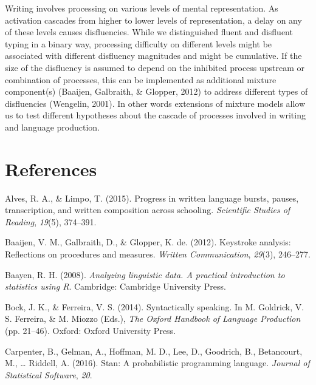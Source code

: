\documentclass[english,man,floatsintext]{apa7}
\begin{document}
Writing involves processing on various levels of mental representation. As activation cascades from higher to lower levels of representation, a delay on any of these levels causes disfluencies. While we distinguished fluent and disfluent typing in a binary way, processing difficulty on different levels might be associated with different disfluency magnitudes and might be cumulative. If the size of the disfluency is assumed to depend on the inhibited process upstream or combination of processes, this can be implemented as additional mixture component(s) (Baaijen, Galbraith, \& Glopper, 2012) to address different types of disfluencies (Wengelin, 2001). In other words extensions of mixture models allow us to test different hypotheses about the cascade of processes involved in writing and language production.

\hypertarget{references}{%
\section{References}\label{references}}

\begingroup
\setlength{\parindent}{-0.5in}
\setlength{\leftskip}{0.5in}

\hypertarget{ref}{}

\endgroup

\hypertarget{refs}{}
\leavevmode\hypertarget{ref-alves2015progress}{}%
Alves, R. A., \& Limpo, T. (2015). Progress in written language bursts, pauses, transcription, and written composition across schooling. \emph{Scientific Studies of Reading}, \emph{19}(5), 374--391.

\leavevmode\hypertarget{ref-baaijen2012keystroke}{}%
Baaijen, V. M., Galbraith, D., \& Glopper, K. de. (2012). Keystroke analysis: Reflections on procedures and measures. \emph{Written Communication}, \emph{29}(3), 246--277.

\leavevmode\hypertarget{ref-baa08book}{}%
Baayen, R. H. (2008). \emph{Analyzing linguistic data. A practical introduction to statistics using R}. Cambridge: Cambridge University Press.

\leavevmode\hypertarget{ref-bock2014syntactically}{}%
Bock, J. K., \& Ferreira, V. S. (2014). Syntactically speaking. In M. Goldrick, V. S. Ferreira, \& M. Miozzo (Eds.), \emph{The Oxford Handbook of Language Production} (pp. 21--46). Oxford: Oxford University Press.

\leavevmode\hypertarget{ref-carpenter2016stan}{}%
Carpenter, B., Gelman, A., Hoffman, M. D., Lee, D., Goodrich, B., Betancourt, M., \ldots{} Riddell, A. (2016). Stan: A probabilistic programming language. \emph{Journal of Statistical Software}, \emph{20}.
\end{document}
